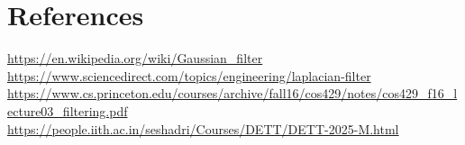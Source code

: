 \documentclass[12pt]{article}
\begin{document}
\section{\textbf{References}}
\href{https://en.wikipedia.org/wiki/Gaussian_filter}{https://en.wikipedia.org/wiki/Gaussian_filter} \\
\href{https://www.sciencedirect.com/topics/engineering/laplacian-filter}{https://www.sciencedirect.com/topics/engineering/laplacian-filter} \\
\href{https://www.cs.princeton.edu/courses/archive/fall16/cos429/notes/cos429_f16_lecture03_filtering.pdf}{https://www.cs.princeton.edu/courses/archive/fall16/cos429/notes/cos429_f16_lecture03_filtering.pdf} \\
\href{https://people.iith.ac.in/seshadri/Courses/DETT/DETT-2025-M.html}{https://people.iith.ac.in/seshadri/Courses/DETT/DETT-2025-M.html} \\
\end{document}

